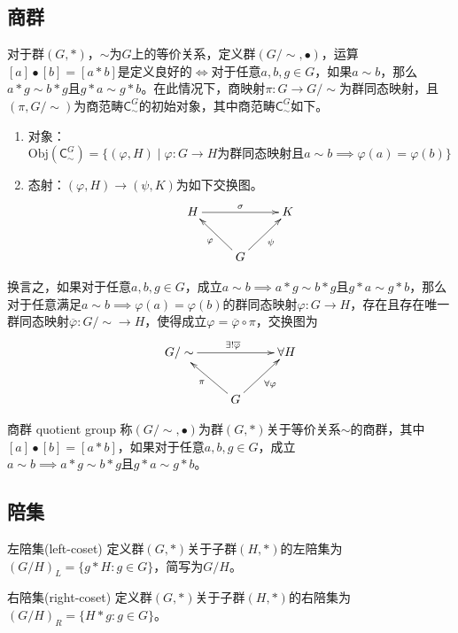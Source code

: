 \subsection{商群}

\begin{proposition}
	对于群$(G,*)$，$\sim$为$G$上的等价关系，定义群$(G/\sim,\bullet)$，运算$[a]\bullet[b]=[a*b]$是定义良好的$\iff$对于任意$a,b,g\in G$，如果$a\sim b$，那么$a*g\sim b*g$且$g*a\sim g*b$。在此情况下，商映射$\pi:G\to G/\sim$为群同态映射，且$(\pi,G/\sim)$为商范畴$\mathsf{C}_{\sim}^{G}$的初始对象，其中商范畴$\mathsf{C}_{\sim}^{G}$如下。
	\begin{enumerate}
		\item 对象：$\mathrm{Obj}(\mathsf{C}_{\sim}^{G})=\{ (\varphi,H)\mid \varphi:G\to H\text{为群同态映射且}a\sim b\implies \varphi(a)=\varphi(b) \}$
		\item 态射：$(\varphi,H)\to(\psi,K)$为如下交换图。
		$$
		\xymatrix{
			H \ar^\sigma[rr]& &K\\
			& G \ar[ul]^{\varphi} \ar[ur]_{\psi} &
		}
		$$
	\end{enumerate}
	换言之，如果对于任意$a,b,g\in G$，成立$a\sim b\implies a*g\sim b*g\text{且}g*a\sim g*b$，那么对于任意满足$a\sim b\implies \varphi(a)=\varphi(b)$的群同态映射$\varphi:G\to H$，存在且存在唯一群同态映射$\overline{\varphi}:G/\sim\to H$，使得成立$\varphi=\overline{\varphi}\circ\pi$，交换图为
	$$
	\xymatrix{
		G/\sim \ar^{\exists!\overline{\varphi}}[rr]& &\forall H\\
		& G \ar[ul]^{\pi} \ar[ur]_{\forall\varphi} &
	}
	$$
\end{proposition}

\begin{definition}{商群 quotient group}
	称$(G/\sim,\bullet)$为群$(G,*)$关于等价关系$\sim$的商群，其中$[a]\bullet[b]=[a*b]$，如果对于任意$a,b,g\in G$，成立$a\sim b\implies a*g\sim b*g\text{且}g*a\sim g*b$。
\end{definition}

\subsection{陪集}

\begin{definition}{左陪集(left-coset)}
	定义群$(G,*)$关于子群$(H,*)$的左陪集为$(G/H)_L=\{ g*H:g\in G \}$，简写为$G/H$。
\end{definition}

\begin{definition}{右陪集(right-coset)}
	定义群$(G,*)$关于子群$(H,*)$的右陪集为$(G/H)_R=\{ H*g:g\in G \}$。
\end{definition}

